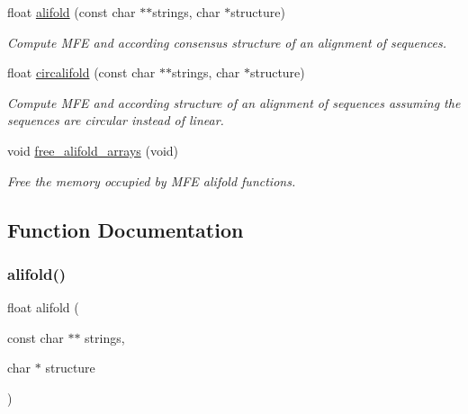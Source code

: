 \begin{DoxyCompactItemize}
\item 
float \mbox{\hyperlink{group__mfe__global__deprecated_ga4cf00f0659e5f0480335d69e797f05b1}{alifold}} (const char $\ast$$\ast$strings, char $\ast$structure)
\begin{DoxyCompactList}\small\item\em Compute M\+FE and according consensus structure of an alignment of sequences. \end{DoxyCompactList}\item 
float \mbox{\hyperlink{group__mfe__global__deprecated_gadbd3b0b1c144cbfb4efe704b2b260f96}{circalifold}} (const char $\ast$$\ast$strings, char $\ast$structure)
\begin{DoxyCompactList}\small\item\em Compute M\+FE and according structure of an alignment of sequences assuming the sequences are circular instead of linear. \end{DoxyCompactList}\item 
void \mbox{\hyperlink{group__mfe__global__deprecated_ga72095e4554b5d577250ea14c42acc49e}{free\+\_\+alifold\+\_\+arrays}} (void)
\begin{DoxyCompactList}\small\item\em Free the memory occupied by M\+FE alifold functions. \end{DoxyCompactList}\end{DoxyCompactItemize}


\subsection{Function Documentation}
\mbox{\label{group__mfe__global__deprecated_ga4cf00f0659e5f0480335d69e797f05b1}} 
\subsubsection{\texorpdfstring{alifold()}{alifold()}}
{\footnotesize\ttfamily float alifold (\begin{DoxyParamCaption}\item[{const char $\ast$$\ast$}]{strings,  }\item[{char $\ast$}]{structure }\end{DoxyParamCaption})}



